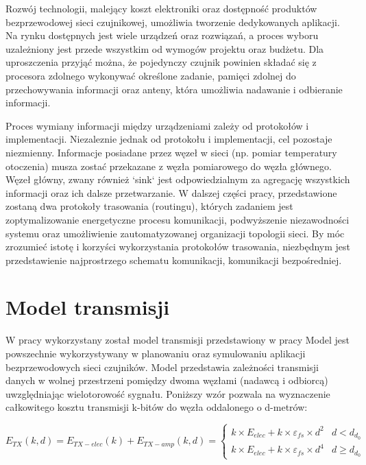 \documentclass[a4paper,12pt,twoside,openany]{report}
\begin{document}
Rozwój technologii, malejący koszt elektroniki oraz dostępność produktów bezprzewodowej sieci czujnikowej, umożliwia tworzenie dedykowanych aplikacji.
Na rynku dostępnych jest wiele urządzeń oraz rozwiązań, a proces wyboru uzależniony jest przede wszystkim od wymogów projektu oraz budżetu.
Dla uproszczenia przyjąć można, że pojedynczy czujnik powinien składać się z procesora zdolnego wykonywać określone zadanie, pamięci zdolnej do przechowywania informacji
oraz anteny, która umożliwia nadawanie i odbieranie informacji.

Proces wymiany informacji między urządzeniami zależy od protokołów i implementacji.
Niezaleznie jednak od protokołu i implementacji, cel pozostaje niezmienny. Informacje posiadane przez węzeł w sieci (np. pomiar temperatury otoczenia) musza zostać przekazane z węzła pomiarowego 
do węzła głównego. Węzeł główny, zwany również `sink` jest odpowiedzialnym za agregację wszystkich informacji oraz ich dalsze przetwarzanie.  
W dalszej części pracy, przedstawione zostaną dwa protokoły trasowania (routingu), których zadaniem jest zoptymalizowanie energetyczne procesu komunikacji, podwyższenie niezawodności systemu 
oraz umożliwienie zautomatyzowanej organizacji topologii sieci.
By móc zrozumieć istotę i korzyści wykorzystania protokołów trasowania, niezbędnym jest przedstawienie najprostrzego schematu komunikacji, komunikacji bezpośredniej.

\section{Model transmisji}

W pracy wykorzystany został model transmisji przedstawiony w pracy %
Model jest powszechnie wykorzystywany w planowaniu oraz symulowaniu aplikacji bezprzewodowych sieci czujników.
Model przedstawia zależności transmisji danych w wolnej przestrzeni pomiędzy dwoma węzłami (nadawcą i odbiorcą) uwzględniając wielotorowość sygnału.
Poniższy wzór pozwala na wyznaczenie całkowitego kosztu transmisji k-bitów do węzła oddalonego o d-metrów:

\[
E_{TX}(k,d) = E_{TX-elec}(k) + E_{TX-amp}(k,d) = \begin{cases}
 k \times E_{elec} + k \times \varepsilon_{fs} \times d^2 & d < d_{d_{0}}\\
 k \times E_{elec} + k \times \varepsilon_{fs} \times d^4 & d \geq d_{d_{0}}
\end{cases}
\]
\end{document}
